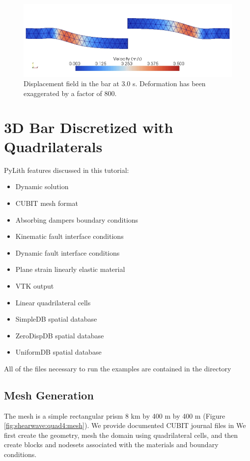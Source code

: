 \begin{figure}
  \includegraphics[scale=0.5]{examples/figs/shearwave_tri3deform30}
  \caption{Displacement field in the bar at 3.0 s. Deformation has been exaggerated
    by a factor of 800.}
  \label{fig:shearwave:tri3:deform}
\end{figure}


\section{3D Bar Discretized with Quadrilaterals}
\label{sec:example:shearwave:quad4}

PyLith features discussed in this tutorial:
\begin{itemize}
\item Dynamic solution
\item CUBIT mesh format
\item Absorbing dampers boundary conditions
\item Kinematic fault interface conditions
\item Dynamic fault interface conditions
\item Plane strain linearly elastic material
\item VTK output
\item Linear quadrilateral cells
\item SimpleDB spatial database
\item ZeroDispDB spatial database
\item UniformDB spatial database
\end{itemize}
All of the files necessary to run the examples are contained in the
directory 


\subsection{Mesh Generation}

The mesh is a simple rectangular prism 8 km by 400 m by 400 m (Figure
\vref{fig:shearwave:quad4:mesh}). We provide documented CUBIT journal
files in  We first create the
geometry, mesh the domain using quadrilateral cells, and then create
blocks and nodesets associated with the materials and boundary conditions.

